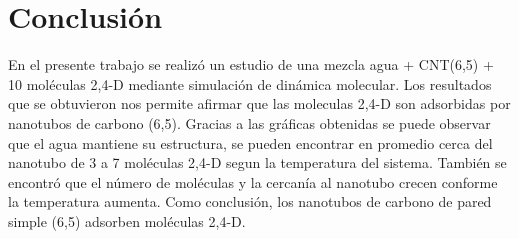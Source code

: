 \chapter{Conclusión}

En el presente trabajo se realizó un estudio de una mezcla agua + CNT(6,5) + 10 moléculas 2,4-D mediante simulación de dinámica molecular. Los resultados que se obtuvieron nos permite afirmar que las moleculas 2,4-D son adsorbidas por nanotubos de carbono (6,5). Gracias a las gráficas obtenidas se puede observar que el agua mantiene su estructura, se pueden encontrar en promedio cerca del nanotubo de 3 a 7 moléculas 2,4-D segun la temperatura del sistema. También se encontró que el número de moléculas y la cercanía al nanotubo crecen conforme la temperatura aumenta. Como conclusión, los nanotubos de carbono de pared simple (6,5) adsorben moléculas 2,4-D.